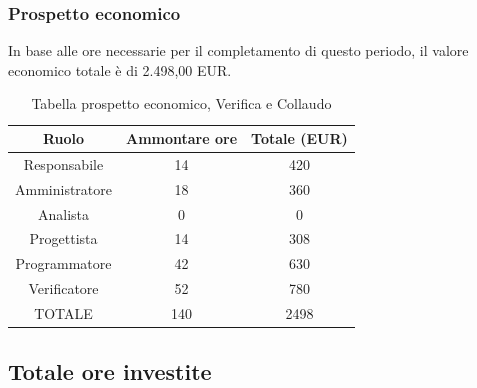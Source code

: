 \subsubsection{Prospetto economico}
In base alle ore necessarie per il completamento di questo periodo, il valore economico totale è di 2.498,00 EUR.
\begin{table}[h]
\caption{Tabella prospetto economico, Verifica e Collaudo}  
\begin{center}
\begin{tabular}{ |c|c|c|  }
 \hline
 Ruolo 		& Ammontare ore 	& Totale (EUR)\\
 \hline
 \hline
 	Responsabile	& 14 	& 420\\
	Amministratore	& 18		& 360\\
	Analista		& 0 		& 0\\
	Progettista		& 14		& 308\\
	Programmatore	& 42		& 630\\
	Verificatore	& 52 	& 780\\
 \hline\hline
 TOTALE		& 140		& 2498\\
  \hline
\end{tabular}
\end{center}
\end{table}
\newpage
\subsection{Totale ore investite}

